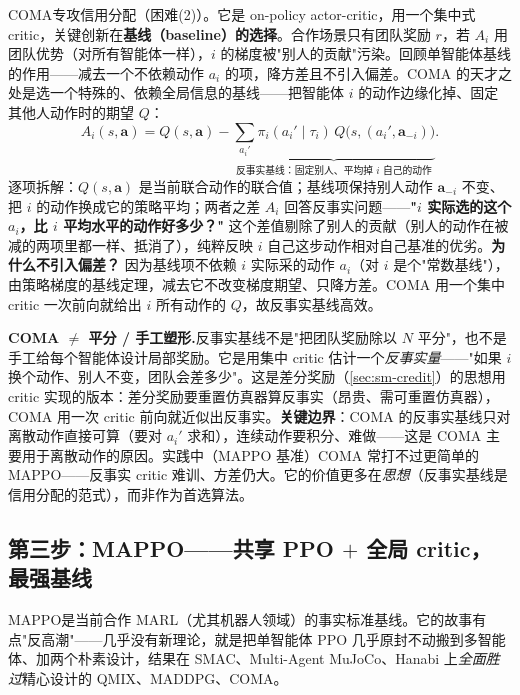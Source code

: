 COMA\cite{foerster2018coma}专攻信用分配（困难(2)）。它是 on-policy actor-critic，用一个集中式 critic，关键创新在\textbf{基线（baseline）的选择}。合作场景只有团队奖励 $r$，若 $A_i$ 用团队优势（对所有智能体一样），$i$ 的梯度被"别人的贡献"污染。回顾单智能体基线的作用——减去一个不依赖动作 $a_i$ 的项，降方差且不引入偏差。COMA 的天才之处是选一个特殊的、依赖全局信息的基线——把智能体 $i$ 的动作边缘化掉、固定其他人动作时的期望 $Q$：
\begin{equation}
  A_i(s,\mathbf{a})=Q(s,\mathbf{a})-\underbrace{\sum_{a_i'}\pi_i(a_i'\mid\tau_i)\,Q\big(s,(a_i',\mathbf{a}_{-i})\big)}_{\text{反事实基线：固定别人、平均掉 }i\text{ 自己的动作}}.
  \label{eq:sm-coma}
\end{equation}
逐项拆解：$Q(s,\mathbf{a})$ 是当前联合动作的联合值；基线项保持别人动作 $\mathbf{a}_{-i}$ 不变、把 $i$ 的动作换成它的策略平均；两者之差 $A_i$ 回答反事实问题——\textbf{"$i$ 实际选的这个 $a_i$，比 $i$ 平均水平的动作好多少？"} 这个差值剔除了别人的贡献（别人的动作在被减的两项里都一样、抵消了），纯粹反映 $i$ 自己这步动作相对自己基准的优劣。\textbf{为什么不引入偏差？} 因为基线项不依赖 $i$ 实际采的动作 $a_i$（对 $i$ 是个"常数基线"），由策略梯度的基线定理，减去它不改变梯度期望、只降方差。COMA 用一个集中 critic 一次前向就给出 $i$ 所有动作的 $Q$，故反事实基线高效。

\begin{note}
\textbf{COMA $\neq$ 平分 / 手工塑形.}\;反事实基线不是"把团队奖励除以 $N$ 平分"，也不是手工给每个智能体设计局部奖励。它是用集中 critic 估计一个\emph{反事实量}——"如果 $i$ 换个动作、别人不变，团队会差多少"。这是差分奖励（\cref{sec:sm-credit}）的思想用 critic 实现的版本：差分奖励要重置仿真器算反事实（昂贵、需可重置仿真器），COMA 用一次 critic 前向就近似出反事实。\textbf{关键边界}：COMA 的反事实基线只对离散动作直接可算（要对 $a_i'$ 求和），连续动作要积分、难做——这是 COMA 主要用于离散动作的原因。实践中（MAPPO 基准）COMA 常打不过更简单的 MAPPO——反事实 critic 难训、方差仍大。它的价值更多在\emph{思想}（反事实基线是信用分配的范式），而非作为首选算法。
\end{note}

\subsection{第三步：MAPPO——共享 PPO \texorpdfstring{$+$}{+} 全局 critic，最强基线}

MAPPO\cite{yu2022mappo}是当前合作 MARL（尤其机器人领域）的事实标准基线。它的故事有点"反高潮"——几乎没有新理论，就是把单智能体 PPO 几乎原封不动搬到多智能体、加两个朴素设计，结果在 SMAC、Multi-Agent MuJoCo、Hanabi 上\emph{全面胜过}精心设计的 QMIX、MADDPG、COMA。

